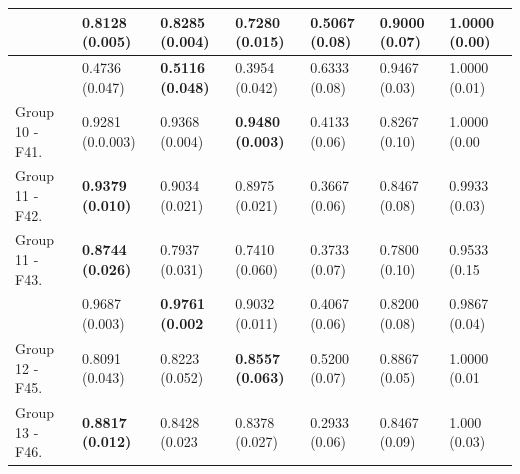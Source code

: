 \begin{center}
\begin{table}[!t]
\begin{tabular}{ccccccc}
		\rowcolor[gray]{.85}  \multicolumn{1}{|l|}{Group 12 - F39.}  & \multicolumn{1}{l}{0.8128 (0.005)} & \multicolumn{1}{l}{\textbf{0.8285 (0.004)}} & \multicolumn{1}{l|}{0.7280 (0.015)}  		& \multicolumn{1}{l}{0.5067 (0.08)} & \multicolumn{1}{l}{0.9000 (0.07)} & \multicolumn{1}{l|}{1.0000 (0.00)} \\ 
		\hline
		\rowcolor[gray]{.85}  \multicolumn{1}{|l|}{Group 12 - F40.}              & \multicolumn{1}{l}{0.4736 (0.047)} & \multicolumn{1}{l}{\textbf{0.5116 (0.048)}} & \multicolumn{1}{l|}{0.3954 (0.042)}  		& \multicolumn{1}{l}{0.6333 (0.08)} & \multicolumn{1}{l}{0.9467 (0.03)} & \multicolumn{1}{l|}{1.0000 (0.01)}  \\ \hline
		\multicolumn{1}{|l|}{Group 10 - F41.}  & \multicolumn{1}{l}{0.9281 (0.0.003)} & \multicolumn{1}{l}{0.9368 (0.004)} & \multicolumn{1}{l|}{\textbf{0.9480 (0.003)}}  		& \multicolumn{1}{l}{0.4133 (0.06)} & \multicolumn{1}{l}{0.8267 (0.10)} & \multicolumn{1}{l|}{1.0000 (0.00} \\ \hline 
		\multicolumn{1}{|l|}{Group 11 - F42.}              & \multicolumn{1}{l}{\textbf{0.9379 (0.010)}} & \multicolumn{1}{l}{0.9034 (0.021)} & \multicolumn{1}{l|}{0.8975 (0.021)}  		& \multicolumn{1}{l}{0.3667 (0.06)} & \multicolumn{1}{l}{0.8467 (0.08)} & \multicolumn{1}{l|}{0.9933 (0.03)}  \\ \hline
		\multicolumn{1}{|l|}{Group 11 - F43.}  & \multicolumn{1}{l}{\textbf{0.8744 (0.026)}} & \multicolumn{1}{l}{0.7937 (0.031)} & \multicolumn{1}{l|}{0.7410 (0.060)}  		& \multicolumn{1}{l}{0.3733 (0.07)} & \multicolumn{1}{l}{0.7800 (0.10)} & \multicolumn{1}{l|}{0.9533 (0.15} \\ \hline
		\rowcolor[gray]{.85}  \multicolumn{1}{|l|}{Group 12 - F44.}              & \multicolumn{1}{l}{0.9687 (0.003)} & \multicolumn{1}{l}{\textbf{0.9761 (0.002}} & \multicolumn{1}{l|}{0.9032 (0.011)}  		& \multicolumn{1}{l}{0.4067 (0.06)} & \multicolumn{1}{l}{0.8200 (0.08)} & \multicolumn{1}{l|}{0.9867 (0.04)} \\ \hline
		\multicolumn{1}{|l|}{Group 12 - F45.}  & \multicolumn{1}{l}{0.8091 (0.043)} & \multicolumn{1}{l}{0.8223 (0.052)} & \multicolumn{1}{l|}{\textbf{0.8557 (0.063)}}  		& \multicolumn{1}{l}{0.5200 (0.07)} & \multicolumn{1}{l}{0.8867 (0.05)} & \multicolumn{1}{l|}{1.0000 (0.01} \\ \hline
		\multicolumn{1}{|l|}{Group 13 - F46.}              & \multicolumn{1}{l}{\textbf{0.8817 (0.012)}} & \multicolumn{1}{l}{0.8428 (0.023} & \multicolumn{1}{l|}{0.8378 (0.027)}  		& \multicolumn{1}{l}{0.2933 (0.06)} & \multicolumn{1}{l}{0.8467 (0.09)} & \multicolumn{1}{l|}{1.000 (0.03)}  \\ \hline

\end{tabular}
\end{table}
\end{center}
